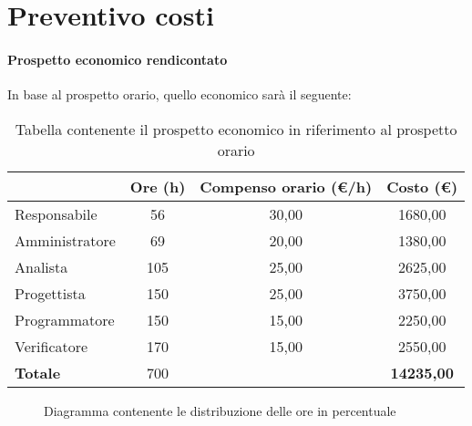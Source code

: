 \section{Preventivo costi}\label{section:preventivo_costi}

\paragraph{Prospetto economico rendicontato}
In base al prospetto orario, quello economico sarà il seguente:

\begin{table}[H]
  \centering
  \renewcommand{\arraystretch}{1.8}
	\begin{tabular}{l|ccc}
		\rowcolor[HTML]{125E28}
		\multicolumn{1}{c}{\color[HTML]{FFFFFF}\textbf{Ruolo}}
		& \color[HTML]{FFFFFF}\textbf{Ore (h)}
		& \color[HTML]{FFFFFF}\textbf{Compenso orario (€/h)}
		& \color[HTML]{FFFFFF}\textbf{Costo (€)} \\
		\hline
		Responsabile		& 56	& 30,00	& 1680,00 \\
		Amministratore	& 69  & 20,00	& 1380,00 \\
		Analista        & 105 & 25,00	& 2625,00 \\
		Progettista     & 150 & 25,00	& 3750,00 \\
		Programmatore 	& 150 & 15,00	& 2250,00	\\
		Verificatore		& 170 & 15,00	& 2550,00 \\
		\hline
		\rowcolor[HTML]{125E28}
		\color[HTML]{FFFFFF}\textbf{Totale}
		& \color[HTML]{FFFFFF}700
		&& \color[HTML]{FFFFFF}\textbf{14235,00}
	\end{tabular}
	\caption{Tabella contenente il prospetto economico in riferimento al prospetto orario}
\end{table}

\begin{figure}[H]
	\centering
	\caption{Diagramma contenente le distribuzione delle ore in percentuale}
\end{figure}